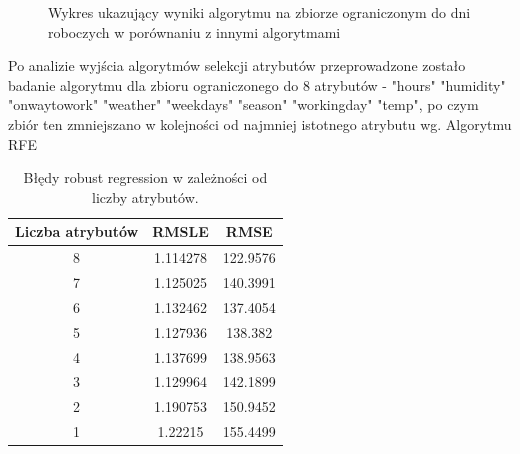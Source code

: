 \documentclass[a4paper,12pt]{article}
\begin{document}
    \begin{figure}[!htb]
        \center
        \caption{Wykres ukazujący wyniki algorytmu na zbiorze ograniczonym do dni roboczych w porównaniu z innymi algorytmami}
    \end{figure}
    
Po analizie wyjścia algorytmów selekcji atrybutów przeprowadzone zostało badanie algorytmu dla zbioru ograniczonego do 8 atrybutów - "hours"    "humidity"  "onwaytowork" "weather" "weekdays"  "season" "workingday"  "temp", po czym zbiór ten zmniejszano w kolejności od najmniej istotnego atrybutu wg. Algorytmu RFE
    
    \begin{table}
    	\centering
        \begin{tabular}{|c|c|c|}
                \hline
                Liczba atrybutów & RMSLE & RMSE \\
                \hline
                8 & 1.114278 & 122.9576 \\
                \hline
                7 & 1.125025 & 140.3991 \\
                \hline
                6 & 1.132462 & 137.4054 \\
                \hline
                5 & 1.127936 & 138.382 \\
                \hline
                4 & 1.137699 & 138.9563 \\
                \hline
                3 & 1.129964 & 142.1899 \\
                \hline
                2 & 1.190753 & 150.9452 \\
                \hline
                1 & 1.22215 & 155.4499 \\
                \hline
        \end{tabular}
        \caption{Błędy robust regression w zależności od liczby atrybutów.}
    \end{table}
    
\end{document}
